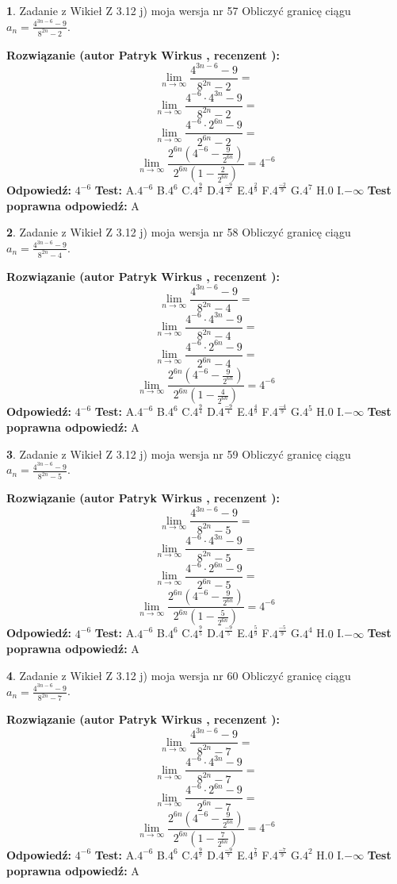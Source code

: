 \documentclass[12pt, a4paper]{article}
\theoremstyle{definition} %
\newtheorem{zad}{}
\newcommand{\zadStart}[1]{\begin{zad}#1\newline}
\newcommand{\zadStop}{\end{zad}}
\newcommand{\rozwStart}[2]{\noindent \textbf{Rozwiązanie (autor #1 , recenzent #2): }\newline}
\newcommand{\rozwStop}{\newline}
\newcommand{\odpStart}{\noindent \textbf{Odpowiedź:}\newline}
\newcommand{\odpStop}{\newline}
\newcommand{\testStart}{\noindent \textbf{Test:}\newline}
\newcommand{\testStop}{\newline}
\newcommand{\kluczStart}{\noindent \textbf{Test poprawna odpowiedź:}\newline}
\newcommand{\kluczStop}{\newline}
\begin{document}
\zadStart{Zadanie z Wikieł Z 3.12 j) moja wersja nr 57}
Obliczyć granicę ciągu $a_{n}=\frac{4^{3n-6}-9}{8^{2n}-2}$.
\zadStop
\rozwStart{Patryk Wirkus}{}
$$\lim\limits_{n\to\infty}\frac{4^{3n-6}-9}{8^{2n}-2}=$$
$$\lim\limits_{n\to\infty}\frac{4^{-6} \cdot 4^{3n}-9}{8^{2n}-2}=$$
$$\lim\limits_{n\to\infty}\frac{4^{-6} \cdot 2^{6n}-9}{2^{6n}-2}=$$
$$\lim\limits_{n\to\infty}\frac{2^{6n}(4^{-6} - \frac{9}{2^{6n}})}{2^{6n}(1-\frac{2}{2^{6n}})}= 4^{-6}$$
\rozwStop
\odpStart
$4^{-6}$
\odpStop
\testStart
A.$4^{-6}$
B.$4^{6}$
C.$4^{\frac{9}{2}}$
D.$4^{\frac{-9}{2}}$
E.$4^{\frac{2}{9}}$
F.$4^{\frac{-2}{9}}$
G.$4^{7}$
H.$0$
I.$-\infty$
\testStop
\kluczStart
A
\kluczStop



\zadStart{Zadanie z Wikieł Z 3.12 j) moja wersja nr 58}
Obliczyć granicę ciągu $a_{n}=\frac{4^{3n-6}-9}{8^{2n}-4}$.
\zadStop
\rozwStart{Patryk Wirkus}{}
$$\lim\limits_{n\to\infty}\frac{4^{3n-6}-9}{8^{2n}-4}=$$
$$\lim\limits_{n\to\infty}\frac{4^{-6} \cdot 4^{3n}-9}{8^{2n}-4}=$$
$$\lim\limits_{n\to\infty}\frac{4^{-6} \cdot 2^{6n}-9}{2^{6n}-4}=$$
$$\lim\limits_{n\to\infty}\frac{2^{6n}(4^{-6} - \frac{9}{2^{6n}})}{2^{6n}(1-\frac{4}{2^{6n}})}= 4^{-6}$$
\rozwStop
\odpStart
$4^{-6}$
\odpStop
\testStart
A.$4^{-6}$
B.$4^{6}$
C.$4^{\frac{9}{4}}$
D.$4^{\frac{-9}{4}}$
E.$4^{\frac{4}{9}}$
F.$4^{\frac{-4}{9}}$
G.$4^{5}$
H.$0$
I.$-\infty$
\testStop
\kluczStart
A
\kluczStop



\zadStart{Zadanie z Wikieł Z 3.12 j) moja wersja nr 59}
Obliczyć granicę ciągu $a_{n}=\frac{4^{3n-6}-9}{8^{2n}-5}$.
\zadStop
\rozwStart{Patryk Wirkus}{}
$$\lim\limits_{n\to\infty}\frac{4^{3n-6}-9}{8^{2n}-5}=$$
$$\lim\limits_{n\to\infty}\frac{4^{-6} \cdot 4^{3n}-9}{8^{2n}-5}=$$
$$\lim\limits_{n\to\infty}\frac{4^{-6} \cdot 2^{6n}-9}{2^{6n}-5}=$$
$$\lim\limits_{n\to\infty}\frac{2^{6n}(4^{-6} - \frac{9}{2^{6n}})}{2^{6n}(1-\frac{5}{2^{6n}})}= 4^{-6}$$
\rozwStop
\odpStart
$4^{-6}$
\odpStop
\testStart
A.$4^{-6}$
B.$4^{6}$
C.$4^{\frac{9}{5}}$
D.$4^{\frac{-9}{5}}$
E.$4^{\frac{5}{9}}$
F.$4^{\frac{-5}{9}}$
G.$4^{4}$
H.$0$
I.$-\infty$
\testStop
\kluczStart
A
\kluczStop



\zadStart{Zadanie z Wikieł Z 3.12 j) moja wersja nr 60}
Obliczyć granicę ciągu $a_{n}=\frac{4^{3n-6}-9}{8^{2n}-7}$.
\zadStop
\rozwStart{Patryk Wirkus}{}
$$\lim\limits_{n\to\infty}\frac{4^{3n-6}-9}{8^{2n}-7}=$$
$$\lim\limits_{n\to\infty}\frac{4^{-6} \cdot 4^{3n}-9}{8^{2n}-7}=$$
$$\lim\limits_{n\to\infty}\frac{4^{-6} \cdot 2^{6n}-9}{2^{6n}-7}=$$
$$\lim\limits_{n\to\infty}\frac{2^{6n}(4^{-6} - \frac{9}{2^{6n}})}{2^{6n}(1-\frac{7}{2^{6n}})}= 4^{-6}$$
\rozwStop
\odpStart
$4^{-6}$
\odpStop
\testStart
A.$4^{-6}$
B.$4^{6}$
C.$4^{\frac{9}{7}}$
D.$4^{\frac{-9}{7}}$
E.$4^{\frac{7}{9}}$
F.$4^{\frac{-7}{9}}$
G.$4^{2}$
H.$0$
I.$-\infty$
\testStop
\kluczStart
A
\kluczStop
\end{document}
